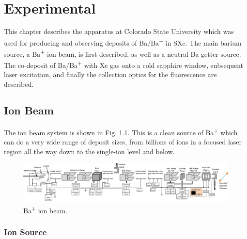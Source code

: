 \chapter{Experimental}


This chapter describes the apparatus at Colorado State University which was used for producing and observing  deposits of Ba/Ba\textsuperscript{+} in SXe.  The main barium source, a Ba\textsuperscript{+} ion beam, is first described, as well as a neutral Ba getter source.  The co-deposit of Ba/Ba\textsuperscript{+} with Xe gas onto a cold sapphire window, subsequent laser excitation, and finally the collection optics for the fluorescence are described.

\section{Ion Beam}

The ion beam system is shown in Fig. \ref{fig:ionbeam}.  This is a clean source of Ba\textsuperscript{+} which can do a very wide range of deposit sizes, from billions of ions in a focused laser region all the way down to the single-ion level and below.

\begin{figure} %
        \centering
                \includegraphics[angle=90,width=.25\textwidth]{figures/ionBeam.png}
                \caption{Ba\textsuperscript{+} ion beam.}
\label{fig:ionbeam}
\end{figure}

\subsection{Ion Source}

